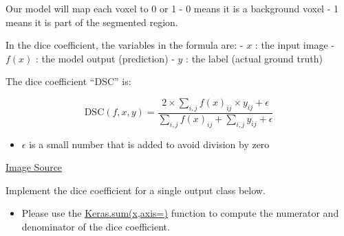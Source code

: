 \documentclass[11pt]{article}
\providecommand{\tightlist}{%
      \setlength{\itemsep}{0pt}\setlength{\parskip}{0pt}}
\begin{document}
Our model will map each voxel to 0 or 1 - 0 means it is a background
voxel - 1 means it is part of the segmented region.

In the dice coefficient, the variables in the formula are: - \(x\) : the
input image - \(f(x)\) : the model output (prediction) - \(y\) : the
label (actual ground truth)

The dice coefficient ``DSC'' is:

\[\text{DSC}(f, x, y) = \frac{2 \times \sum_{i, j} f(x)_{ij} \times y_{ij} + \epsilon}{\sum_{i,j} f(x)_{ij} + \sum_{i, j} y_{ij} + \epsilon}\]

\begin{itemize}
\tightlist
\item
  \(\epsilon\) is a small number that is added to avoid division by zero
\end{itemize}

\href{https://www.researchgate.net/figure/Calculation-of-the-Dice-similarity-coefficient-The-deformed-contour-of-the-liver-from_fig4_328671987}{Image
Source}

Implement the dice coefficient for a single output class below.

\begin{itemize}
\tightlist
\item
  Please use the
  \href{https://www.tensorflow.org/api_docs/python/tf/keras/backend/sum}{Keras.sum(x,axis=)}
  function to compute the numerator and denominator of the dice
  coefficient.
\end{itemize}
\end{document}
